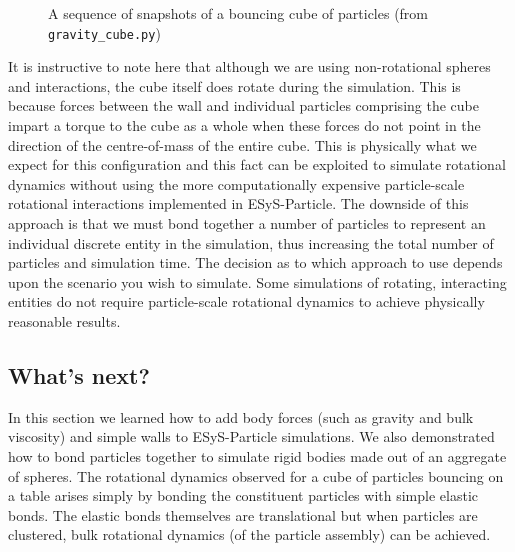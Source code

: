 \begin{figure}
\caption{A sequence of snapshots of a bouncing cube of particles (from \texttt{grav\+i\+ty\_\+cube.py})} \label{fig:gravity_cube}
\end{figure}

It is instructive to note here that although we are using non-rotational spheres and interactions, the cube itself does rotate during the simulation. This is because forces between the wall and individual particles comprising the cube impart a torque to the cube as a whole when these forces do not point in the direction of the centre-of-mass of the entire cube. This is physically what we expect for this configuration and this fact can be exploited to simulate rotational dynamics without using the more computationally expensive particle-scale rotational interactions implemented in ESyS-Particle. The downside of this approach is that we must bond together a number of particles to represent an individual discrete entity in the simulation, thus increasing the total number of particles and simulation time. The decision as to which approach to use depends upon the scenario you wish to simulate. Some simulations of rotating, interacting entities do not require particle-scale rotational dynamics to achieve 
physically reasonable results.

\subsection*{What's next?}

In this section we learned how to add body forces (such as gravity and bulk viscosity) and simple walls to ESyS-Particle simulations. We also demonstrated how to bond particles together to simulate rigid bodies made out of an aggregate of spheres. The rotational dynamics observed for a cube of particles bouncing on a table arises simply by bonding the constituent particles with simple elastic bonds. The elastic bonds themselves are translational but when particles are clustered, bulk rotational dynamics (of the particle assembly) can be achieved.

